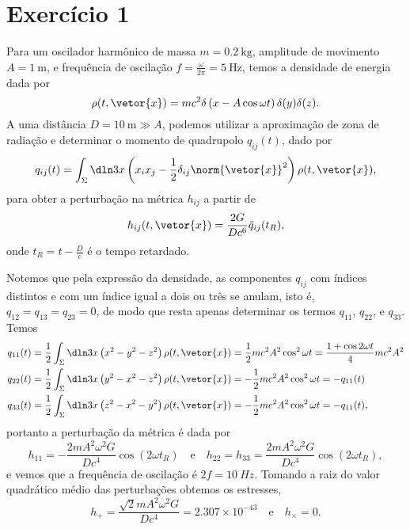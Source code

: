 \section*{Exercício 1}
Para um oscilador harmônico de massa \(m = \SI{0.2}{\kilogram}\), amplitude de movimento \(A = \SI{1}{\meter}\), e frequência de oscilação \(f = \frac{\omega}{2\pi} = \SI{5}{\hertz}\), temos a densidade de energia dada por
\begin{equation*}
    \rho(t, \vetor{x}) = mc^2 \delta\left(x - A \cos\omega t\right)\delta(y)\delta(z).
\end{equation*}
A uma distância \(D = \SI{10}{\meter} \gg A\), podemos utilizar a aproximação de zona de radiação e determinar o momento de quadrupolo \(q_{ij}(t)\), dado por
\begin{equation*}
    q_{ij}(t) = \int_{\Sigma} \dln3x \left(x_i x_j - \frac12 \delta_{ij} \norm{\vetor{x}}^2\right)\rho(t, \vetor{x}),
\end{equation*}
para obter a perturbação na métrica \(h_{ij}\) a partir de
\begin{equation*}
    h_{ij}(t, \vetor{x}) = \frac{2G}{Dc^6} \ddot{q}_{ij}(t_R),
\end{equation*}
onde \(t_R = t - \frac{D}{c}\) é o tempo retardado.

Notemos que pela expressão da densidade, as componentes \(q_{ij}\) com índices distintos e com um índice igual a dois ou três se anulam, isto é, \(q_{12} = q_{13} = q_{23} = 0\), de modo que resta apenas determinar os termos \(q_{11}\), \(q_{22}\), e \(q_{33}\). Temos
\begin{align*}
    q_{11}(t) &= \frac12 \int_{\Sigma} \dln3x \left(x^2 - y^2 - z^2\right) \rho(t, \vetor{x}) = \frac12 mc^2A^2 \cos^2\omega t = \frac{1 + \cos2\omega t}4 mc^2A^2\\
    q_{22}(t) &= \frac12 \int_{\Sigma} \dln3x \left(y^2-x^2  - z^2\right) \rho(t, \vetor{x})= -\frac12 mc^2A^2 \cos^2\omega t = -q_{11}(t)\\
    q_{33}(t) &= \frac12 \int_{\Sigma} \dln3x \left(z^2-x^2 - y^2\right) \rho(t, \vetor{x})= -\frac12 mc^2A^2\cos^2\omega t = -q_{11}(t),
\end{align*}
portanto a perturbação da métrica é dada por
\begin{equation*}
    h_{11} = -\frac{2mA^2\omega^2G}{Dc^4} \cos(2\omega t_R)\quad\text{e}\quad h_{22} = h_{33} = \frac{2mA^2\omega^2G}{Dc^4} \cos(2\omega t_R),
\end{equation*}
e vemos que a frequência de oscilação é \(2f = \SI{10}{Hz}\). Tomando a raiz do valor quadrático médio das perturbações obtemos os estresses,
\begin{equation*}
    h_+ = \frac{\sqrt{2}mA^2\omega^2 G}{D c^4} = 2.307\times 10^{-43}\quad\text{e}\quad h_\times = 0.
\end{equation*}

